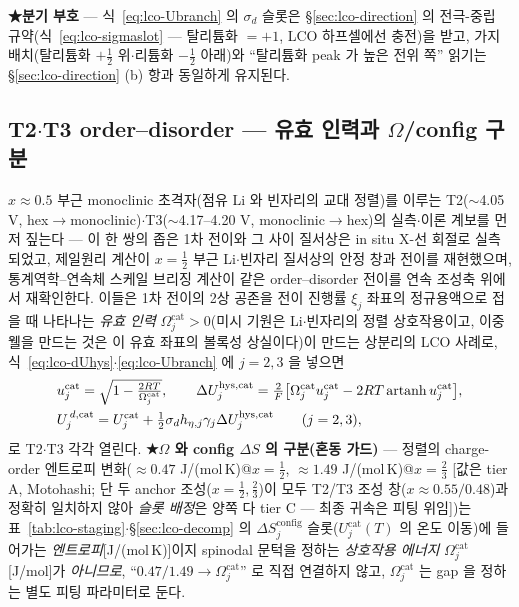 \textbf{★분기 부호} --- 식~\eqref{eq:lco-Ubranch} 의 $\sigma_d$ 슬롯은 \S\ref{sec:lco-direction} 의 전극-중립
규약(식~\eqref{eq:lco-sigmaslot} --- 탈리튬화 $=+1$, LCO 하프셀에선 충전)을 받고, 가지 배치(탈리튬화
$+\tfrac12$ 위$\cdot$리튬화 $-\tfrac12$ 아래)와 ``탈리튬화 peak 가 높은 전위 쪽'' 읽기는 \S\ref{sec:lco-direction} (b)
항과 동일하게 유지된다.

\subsection{T2$\cdot$T3 order--disorder --- 유효 인력과 $\Omega$/config 구분}\label{sec:lco-hys-od}
$x\approx0.5$ 부근 monoclinic 초격자(점유 Li 와 빈자리의 교대 정렬)를 이루는 T2($\sim$4.05 V,
hex$\to$monoclinic)$\cdot$T3($\sim$4.17--4.20 V, monoclinic$\to$hex)의 실측$\cdot$이론 계보를 먼저
짚는다 --- 이 한 쌍의 좁은 1차 전이와 그 사이 질서상은 in situ X-선 회절로 실측되었고\cite{reimers1992},
제일원리 계산이 $x{=}\tfrac12$ 부근 Li$\cdot$빈자리 질서상의 안정 창과 전이를 재현했으며\cite{vanderven1998},
통계역학–연속체 스케일 브리징 계산이 같은 order--disorder 전이를 연속 조성축 위에서
재확인한다\cite{ml2024}. 이들은 1차 전이의 2상 공존을 전이
진행률 $\xi_j$ 좌표의 정규용액으로 접을 때 나타나는 \emph{유효 인력} $\Omega_j^\mathrm{cat}>0$(미시
기원은 Li$\cdot$빈자리의 정렬 상호작용이고, 이중웰을 만드는 것은 이 유효 좌표의 볼록성 상실이다)이
만드는 상분리의 LCO 사례로, 식~\eqref{eq:lco-dUhys}$\cdot$\eqref{eq:lco-Ubranch} 에 $j=2,3$ 을 넣으면
\[
\begin{aligned}
&u_j^\mathrm{cat}=\sqrt{1-\tfrac{2RT}{\Omega_j^\mathrm{cat}}},\qquad
\Delta U_j^{\mathrm{hys},\mathrm{cat}}=\tfrac{2}{F}\big[\Omega_j^\mathrm{cat}u_j^\mathrm{cat}
-2RT\,\mathrm{artanh}\,u_j^\mathrm{cat}\big],\\
&U_j^{\,d,\mathrm{cat}}=U_j^\mathrm{cat}+\tfrac12\sigma_d h_{\eta,j}\gamma_j\Delta U_j^{\mathrm{hys},\mathrm{cat}}
\qquad(j=2,3),
\end{aligned}
\]
로 T2$\cdot$T3 각각 열린다. \textbf{★$\Omega$ 와 config $\Delta S$ 의 구분(혼동 가드)} --- 정렬의 charge-order
엔트로피 변화($\approx0.47$ J/(mol\,K)@$x{=}\tfrac12$, $\approx1.49$ J/(mol\,K)@$x{=}\tfrac23$
[값은 tier A, Motohashi\cite{motohashi2009}; 단 두 anchor 조성($x{=}\tfrac12,\tfrac23$)이 모두 T2/T3
조성 창($x\approx0.55/0.48$)과 정확히 일치하지 않아 \emph{슬롯 배정}은 양쪽 다 tier C --- 최종 귀속은 피팅
위임])는 표~\ref{tab:lco-staging}$\cdot$\S\ref{sec:lco-decomp} 의
$\Delta S_j^\mathrm{config}$ 슬롯($U_j^\mathrm{cat}(T)$ 의 온도 이동)에 들어가는 \emph{엔트로피}[J/(mol\,K)]이지
spinodal 문턱을 정하는 \emph{상호작용 에너지} $\Omega_j^\mathrm{cat}$[J/mol]가 \emph{아니므로},
``$0.47/1.49\to\Omega_j^\mathrm{cat}$'' 로 직접 연결하지 않고, $\Omega_j^\mathrm{cat}$ 는 gap 을 정하는
별도 피팅 파라미터로 둔다.

